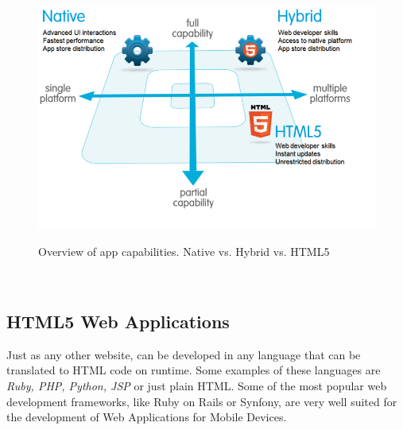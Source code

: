 \begin{figure}[H]
    \begin{center}
        {\includegraphics[width=1\linewidth]{gfx/Native_html5_hybrid}}
        \caption[Overview of app capabilities. Native vs. Hybrid vs. HTML5]{Overview of app capabilities. Native vs. Hybrid vs. HTML5\footnotemark}\label{fig:hybrid_native}
    \end{center}
\end{figure}
\\

\subsection{HTML5 Web Applications}\label{sec:web_app}
Just as any other website,  can be developed in any language that can be translated to HTML code on runtime. Some examples of these languages are \emph{Ruby, PHP, Python, JSP} or just plain HTML. Some of the most popular web development frameworks, like Ruby on Rails or Synfony, are very well suited for the development of Web Applications for Mobile Devices.



